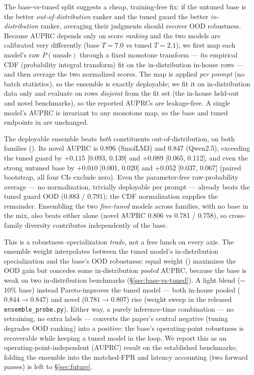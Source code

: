 \documentclass[sigconf,nonacm]{acmart}
\begin{document}
The base-vs-tuned split suggests a cheap, training-free fix: if the untuned base is the better \emph{out-of-distribution} ranker and the tuned guard the better \emph{in-distribution} ranker, averaging their judgments should recover OOD robustness. Because AUPRC depends only on score \emph{ranking} and the two models are calibrated very differently (base $T{=}7.0$ vs tuned $T{=}2.1$), we first map each model's raw $P(\text{unsafe})$ through a fixed monotone transform --- its empirical CDF (probability integral transform) fit on the in-distribution in-house rows --- and then average the two normalized scores. The map is applied \emph{per prompt} (no batch statistics), so the ensemble is exactly deployable; we fit it on in-distribution data only and evaluate on rows \emph{disjoint} from the fit set (the in-house held-out and novel benchmarks), so the reported AUPRCs are leakage-free. A single model's AUPRC is invariant to any monotone map, so the base and tuned endpoints in  are unchanged.

The deployable ensemble beats \emph{both} constituents out-of-distribution, on both families (). Its novel AUPRC is 0.896 (SmolLM3) and 0.847 (Qwen2.5), exceeding the tuned guard by $+0.115$ [0.093, 0.139] and $+0.089$ [0.065, 0.112], and even the strong untuned base by $+0.010$ [0.001, 0.020] and $+0.052$ [0.037, 0.067] (paired bootstrap, all four CIs exclude zero). Even the parameter-free raw-probability average --- no normalization, trivially deployable per prompt --- already beats the tuned guard OOD (0.883 / 0.791); the CDF normalization supplies the remainder. Ensembling the two \emph{fine-tuned} models across families, with no base in the mix, also beats either alone (novel AUPRC 0.806 vs 0.781 / 0.758), so cross-family diversity contributes independently of the base.

This is a robustness--specialization \emph{trade}, not a free lunch on every axis. The ensemble weight interpolates between the tuned model's in-distribution specialization and the base's OOD robustness: equal weight () maximizes the OOD gain but concedes some in-distribution \emph{pooled} AUPRC, because the base is weak on two in-distribution benchmarks (\S\ref{sec:base-vs-tuned}). A light blend ($\sim$10\% base) instead Pareto-improves the tuned model --- both in-house pooled ($0.844\!\to\!0.847$) and novel ($0.781\!\to\!0.807$) rise (weight sweep in the released \texttt{ensemble\_probe.py}). Either way, a purely inference-time combination --- no retraining, no extra labels --- converts the paper's central negative (tuning degrades OOD ranking) into a positive: the base's operating-point robustness is recoverable while keeping a tuned model in the loop. We report this as an operating-point-independent (AUPRC) result on the established benchmarks; folding the ensemble into the matched-FPR and latency accounting (two forward passes) is left to \S\ref{sec:future}.
\end{document}
